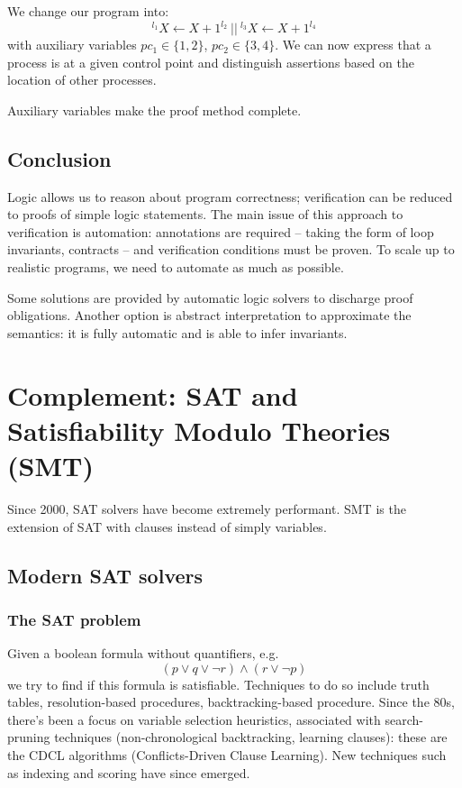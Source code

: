 \documentclass[toc]{../cs-classes/cs-classes}
\begin{document}
\begin{example}
    We change our program into:
    \begin{equation*}
        {}^{l_1}X\leftarrow X+1^{l_2} \:||\: {}^{l_3}X\leftarrow X+1^{l_4}
    \end{equation*}
    with auxiliary variables $pc_1\in\{1, 2\}$, $pc_2\in\{3, 4\}$. We can now express that a process is at a given control point and distinguish assertions based on the location of other processes.
\end{example}

Auxiliary variables make the proof method complete.

\subsection*{Conclusion}
Logic allows us to reason about program correctness; verification can be reduced to proofs of simple logic statements. The main issue of this approach to verification is automation: annotations are required -- taking the form of loop invariants, contracts -- and verification conditions must be proven. To scale up to realistic programs, we need to automate as much as possible. 

Some solutions are provided by automatic logic solvers to discharge proof obligations. Another option is abstract interpretation to approximate the semantics: it is fully automatic and is able to infer invariants.


\newpage
\section{Complement: SAT and Satisfiability Modulo Theories (SMT)}
Since 2000, SAT solvers have become extremely performant. SMT is the extension of SAT with clauses instead of simply variables.
\subsection{Modern SAT solvers}
\subsubsection{The SAT problem}
Given a boolean formula without quantifiers, e.g.
\begin{equation*}
    (p\lor q\lor \lnot r)\land(r\lor \lnot p)
\end{equation*}
we try to find if this formula is satisfiable. Techniques to do so include truth tables, resolution-based procedures, backtracking-based procedure. Since the 80s, there's been a focus on variable selection heuristics, associated with search-pruning techniques (non-chronological backtracking, learning clauses): these are the CDCL algorithms (Conflicts-Driven Clause Learning). New techniques such as indexing and scoring have since emerged.
\end{document}
